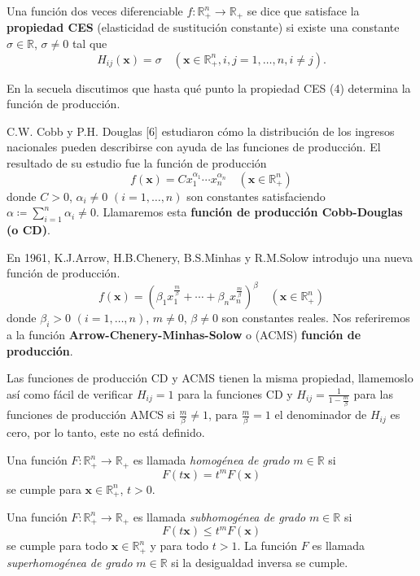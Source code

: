 \documentclass[a4paper,fleqn]{cas-dc}
\begin{document}
\begin{definition}
Una función dos veces diferenciable $f\colon\mathds{R}^{n}_{+}\rightarrow\mathds{R}_{+}$ se dice que satisface la \textbf{propiedad CES} (elasticidad de sustitución constante) si existe una constante $\sigma\in\mathds{R}$, $\sigma\neq0$ tal que
\begin{equation}
H_{ij}\left(\bm{x}\right)=\sigma\quad\left(\bm{x}\in\mathds{R}^{n}_{+},i,j=1,\ldots,n,i\neq j\right).
\end{equation}
\end{definition}
En la secuela discutimos que hasta qué punto la propiedad CES (4) determina la función de producción.

C.W. Cobb y P.H. Douglas [6] estudiaron cómo la distribución de los ingresos nacionales pueden describirse con ayuda de las funciones de producción. El resultado de su estudio fue la función de producción \[ f\left(\bm{x}\right)=Cx^{\alpha_{1}}_{1}\cdots x^{\alpha_{n}}_{n}\quad\left(\bm{x}\in\mathds{R}^{n}_{+}\right) \] donde $C>0$, $\alpha_{i}\neq0$ $\left(i=1,\ldots,n\right)$ son constantes satisfaciendo $\alpha\coloneqq\sum_{i=1}^{n}\alpha_{i}\neq0$. Llamaremos esta \textbf{función de producción Cobb-Douglas (o CD)}.

En 1961, K.J.Arrow, H.B.Chenery, B.S.Minhas y R.M.Solow introdujo una nueva función de producción. \[ f\left(\bm{x}\right)={\left(\beta_{1}x_{1}^{\frac{m}{\beta}}+\cdots+\beta_{n}x_{n}^{\frac{m}{\beta}}\right)}^{\beta}\quad\left(\bm{x}\in\mathds{R}^{n}_{+}\right) \] donde $\beta_{i}>0$ $\left(i=1,\ldots,n\right)$, $m\neq0$, $\beta\neq0$ son constantes reales. Nos referiremos a la función \textbf{Arrow-Chenery-Minhas-Solow} o (ACMS) \textbf{función de producción}.

Las funciones de producción CD y ACMS tienen la misma propiedad, llamemoslo así como fácil de verificar $H_{ij}=1$ para la funciones CD y $H_{ij}=\frac{1}{1-\frac{m}{\beta}}$ para las funciones de producción AMCS si $\frac{m}{\beta}\neq1$, para $\frac{m}{\beta}=1$ el denominador de $H_{ij}$ es cero, por lo tanto, este no está definido.

\begin{definition}
	Una función $F\colon\mathds{R}^{n}_{+}\rightarrow\mathds{R}_{+}$ es llamada \emph{homogénea de grado} $m\in\mathds{R}$ si \[ F\left(t\bm{x}\right)=t^{m}F\left(\bm{x}\right) \] se cumple para $\bm{x}\in\mathds{R}^{n}_{+}$, $t>0$.
\end{definition}

\begin{definition}
Una función $F\colon\mathds{R}^{n}_{+}\rightarrow\mathds{R}_{+}$ es llamada \emph{subhomogénea de grado} $m\in\mathds{R}$ si \[ F\left(t\bm{x}\right)\leq t^{m}F\left(\bm{x}\right) \] se cumple para todo $\bm{x}\in\mathds{R}^{n}_{+}$ y para todo $t>1$. La función $F$ es llamada \emph{superhomogénea de grado} $m\in\mathds{R}$ si la desigualdad inversa se cumple.
\end{definition}
\end{document}
